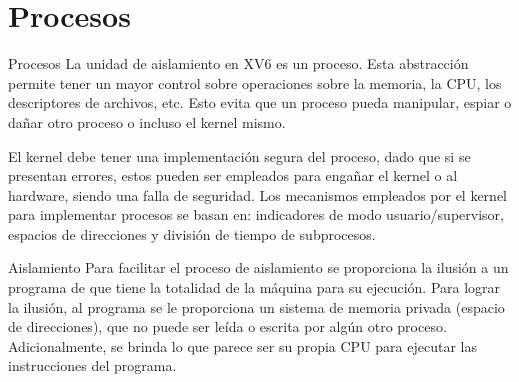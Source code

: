 \documentclass{libs/ufc_format}
\begin{document}
\section{Procesos}
\begin{frame}{Procesos}
  La unidad de aislamiento en XV6 es un proceso. Esta abstracción permite tener un mayor control sobre operaciones sobre la memoria, la CPU, los descriptores de archivos, etc. Esto evita que un proceso pueda manipular, espiar o dañar otro proceso o incluso el kernel mismo.

  \vspace{0.3cm}

  El kernel debe tener una implementación segura del proceso, dado que si se presentan errores, estos pueden ser empleados para engañar el kernel o al hardware, siendo una falla de seguridad. Los mecanismos empleados por el kernel para implementar procesos se basan en: indicadores de modo usuario/supervisor, espacios de direcciones y división de tiempo de subprocesos. \cite{xv6_book}
\end{frame}
\begin{frame}{Aislamiento}
  Para facilitar el proceso de aislamiento se proporciona la ilusión a un programa de que tiene la totalidad de la máquina para su ejecución. Para lograr la ilusión, al programa se le proporciona un sistema de memoria privada (espacio de direcciones), que no puede ser leída o escrita por algún otro proceso. Adicionalmente, se brinda lo que parece ser su propia CPU para ejecutar las instrucciones del programa.
\end{frame}
\end{document}
